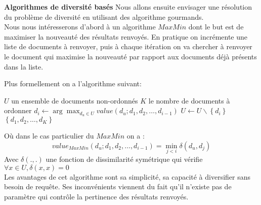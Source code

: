 \documentclass{article}
\begin{document}
\textbf{Algorithmes de diversité basés} Nous allons ensuite envisager une résolution du problème de diversité en utilisant des algorithme gourmands. \\

Nous nous intéresserons d'abord à un algorithme $MaxMin$ dont le but est de maximiser la nouveauté des résultats renvoyés. En pratique on incrémente une liste de documents à renvoyer, puis à chaque itération on va chercher à renvoyer le document qui maximise la nouveauté par rapport aux documents déjà présents dans la liste.

Plus formellement on a l'algorithme suivant:

\begin{algorithm}
\caption{$MaxMin$}
\begin{algorithmic}
\REQUIRE $U$ un ensemble de documents non-ordonnés
\REQUIRE $K$ le nombre de documents à ordonner
\STATE $d_i \leftarrow \arg\max_{d_u \in U} value(d_u;d_1,d_2,\dots,d_{i-1})$ 
\STATE $U \leftarrow U \backslash \left\{d_i\right\}$
\ENDFOR
\RETURN $\left\{d_1, d_2,\dots, d_K\right\}$
\end{algorithmic}
\end{algorithm}

Où dans le cas particulier du $MaxMin$ on a : 
\begin{equation}
value_{MaxMin}(d_u;d_1,d_2,\dots,d_{i-1}) = \min_{j<i} \delta(d_u,d_j)
\end{equation}
Avec $\delta(.,.)$ une fonction de dissimilarité symétrique qui vérifie $\forall x \in U, \delta(x,x) =0$ \\
Les avantages de cet algorithme sont sa simplicité, sa capacité à diversifier sans besoin de requête. Ses inconvénients viennent du fait qu'il n'existe pas de paramètre qui contrôle la pertinence des résultats renvoyés. 
\end{document}
